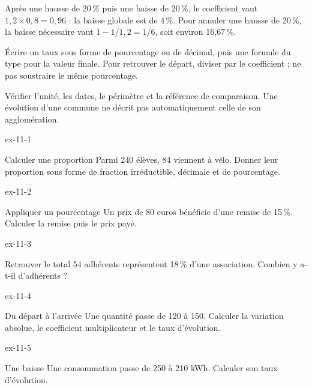 \begin{exemple}Après une hausse de 20\,\% puis une baisse de 20\,\%, le coefficient vaut $1{,}2\times0{,}8=0{,}96$ : la baisse globale est de 4\,\%. Pour annuler une hausse de 20\,\%, la baisse nécessaire vaut $1-1/1{,}2=1/6$, soit environ 16,67\,\%.\end{exemple}
\begin{savoirfaire}[Tableur]Écrire un taux sous forme de pourcentage ou de décimal, puis une formule du type  pour la valeur finale. Pour retrouver le départ, diviser par le coefficient ; ne pas soustraire le même pourcentage.\end{savoirfaire}
Vérifier l’unité, les dates, le périmètre et la référence de comparaison. Une évolution d’une commune ne décrit pas automatiquement celle de son agglomération.
\clearpage{}
\begin{blocLivre}{ex-11-1}
\begin{exercice}[1]{Calculer une proportion}
Parmi 240 élèves, 84 viennent à vélo. Donner leur proportion sous forme de fraction irréductible, décimale et de pourcentage.
\end{exercice}
\end{blocLivre}
\begin{blocLivre}{ex-11-2}
\begin{exercice}[1]{Appliquer un pourcentage}
Un prix de 80 euros bénéficie d’une remise de 15\,\%. Calculer la remise puis le prix payé.
\end{exercice}
\end{blocLivre}
\begin{blocLivre}{ex-11-3}
\begin{exercice}[1]{Retrouver le total}
54 adhérents représentent 18\,\% d’une association. Combien y a-t-il d’adhérents ?
\end{exercice}
\end{blocLivre}
\begin{blocLivre}{ex-11-4}
\begin{exercice}[1]{Du départ à l’arrivée}
Une quantité passe de 120 à 150. Calculer la variation absolue, le coefficient multiplicateur et le taux d’évolution.
\end{exercice}
\end{blocLivre}
\begin{blocLivre}{ex-11-5}
\begin{exercice}[1]{Une baisse}
Une consommation passe de 250 à 210 kWh. Calculer son taux d’évolution.
\end{exercice}
\end{blocLivre}

